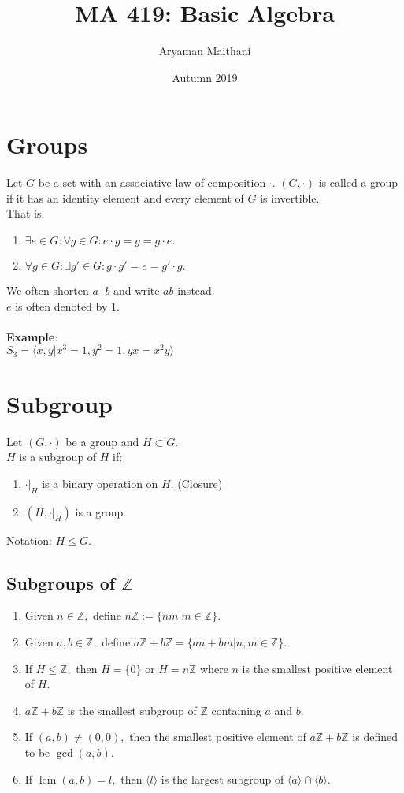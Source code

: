 \documentclass[12 pt, a4paper, toc=graduated, oneside]{article}
\title{MA 419: Basic Algebra}
\author{Aryaman Maithani}
\date{Autumn 2019}
\theoremstyle{definition}
\newcommand{\lcm}{\operatorname{lcm}}
\begin{document}
\maketitle
\tableofcontents
\newpage
%
\section{Groups}
Let $G$ be a set with an associative law of composition $\cdot.$ $(G, \cdot)$ is called a group if it has an identity element and every element of $G$ is invertible.\\
That is,
\begin{enumerate}[nosep]
	\item $\exists e \in G: \forall g \in G: e\cdot g = g = g\cdot e.$
	\item $\forall g \in G: \exists g' \in G: g\cdot g' = e = g'\cdot g.$
\end{enumerate}

We often shorten $a\cdot b$ and write $ab$ instead.\\
$e$ is often denoted by $1.$\\~\\
\textbf{Example}:\\
$S_3 = \langle x, y | x^3 = 1, y^2 = 1, yx = x^2y\rangle$
\section{Subgroup}
Let $(G, \cdot)$ be a group and $H \subset G.$\\
$H$ is a subgroup of $H$ if:
\begin{enumerate}[nosep] 
	\item $\cdot|_H$ is a binary operation on $H.$ (Closure)
	\item $(H, \cdot|_H)$ is a group.\\
\end{enumerate}
Notation: $H \le G.$
\subsection{Subgroups of \texorpdfstring{$\mathbb{Z}$}{Z}}
\begin{enumerate}
	\item Given $n \in \mathbb{Z},$ define $n\mathbb{Z} := \{nm | m \in \mathbb{Z}\}.$
	\item Given $a, b \in \mathbb{Z},$ define $a\mathbb{Z} + b\mathbb{Z} = \{an + bm | n, m \in \mathbb{Z}\}.$ 
	\item If $H \le \mathbb{Z},$ then $H = \{0\}$ or $H = n\mathbb{Z}$ where $n$ is the smallest positive element of $H.$
	\item $a\mathbb{Z} + b\mathbb{Z}$ is the smallest subgroup of $\mathbb{Z}$ containing $a$ and $b.$
	\item If $(a, b) \neq (0, 0),$ then the smallest positive element of $a\mathbb{Z} + b\mathbb{Z}$ is defined to be $\gcd(a, b).$
	\item If $\lcm(a, b) = l,$ then $\langle l \rangle$ is the largest subgroup of $\langle a\rangle \cap \langle b\rangle.$
\end{enumerate}
\end{document}
